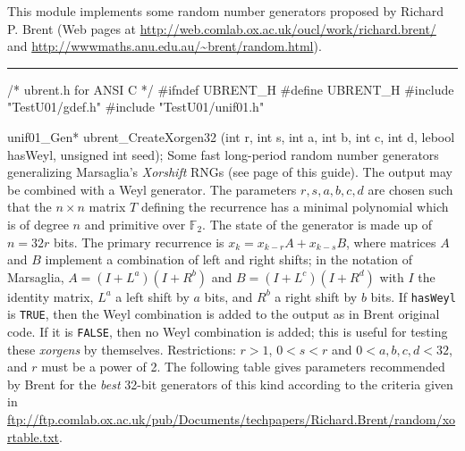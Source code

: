 
This module implements some random number generators proposed by Richard
  P. Brent (Web pages at %
\url{http://web.comlab.ox.ac.uk/oucl/work/richard.brent/}
and \url{http://wwwmaths.anu.edu.au/~brent/random.html}).


\bigskip
\hrule
\code\hide
/* ubrent.h for ANSI C */
#ifndef UBRENT_H
#define UBRENT_H
\endhide
#include "TestU01/gdef.h"
#include "TestU01/unif01.h"
\endcode

\code

unif01_Gen* ubrent_CreateXorgen32 (int r, int s, int a, int b, int c, int d,
                                   lebool hasWeyl, unsigned int seed);
\endcode
  \tab Some fast long-period random number generators \cite{rBRE04a} 
        generalizing Marsaglia's \textit{Xorshift} RNGs \cite{rMAR03a} 
 (see page \pageref{marsa-xorshift} of this guide).  The
   output may be combined with a Weyl generator.
 The parameters $r, s, a, b,  c, d$ are chosen such that the $n \times n$
   matrix $T$ defining the recurrence has a minimal polynomial which
%
      is of degree $n$ and primitive over $\mathbb{F}_2$. 
The state of the generator is made up of $n= 32 r$ bits.
The primary recurrence is $x_k = x_{k-r}A + x_{k-s}B$, where matrices
$A$ and $B$ implement a combination of left and right shifts;
 in the notation of Marsaglia, $A = (I + L^a)(I + R^b)$ and
 $B = (I + L^c)(I + R^d)$ with
 $I$ the identity matrix, $L^a$ a left shift by $a$ bits, 
and $R^b$ a right shift by $b$ bits. If \texttt{hasWeyl} is \texttt{TRUE},
then the Weyl combination is added to the output as in Brent original
code. If it is  \texttt{FALSE}, then no Weyl combination is added;
 this is useful for testing these \textit{xorgens} by themselves.
Restrictions: $r > 1$, $0 < s < r$ and $0 < a,b,c,d < 32$,
and $r$ must be a power of 2.
%
The following table gives parameters recommended by Brent
for the \textit{best} 32-bit generators of this kind
according to the criteria given in \url{ftp://ftp.comlab.ox.ac.uk/pub/Documents/techpapers/Richard.Brent/random/xortable.txt}.
\endtab
%
